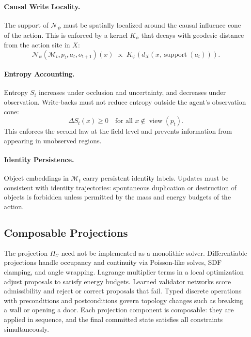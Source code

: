 \documentclass[11pt]{article}
\begin{document}
\paragraph{Causal Write Locality.}
The support of $\mathcal{N}_\psi$ must be spatially localized around the
causal influence cone of the action.
This is enforced by a kernel $K_\psi$ that decays with geodesic distance
from the action site in $X$:
\[
\mathcal{N}_\psi(\mathcal{M}_t, p_t, a_t, o_{t+1})(x)
\;\propto\;
K_\psi\!\left(d_X(x, \operatorname{support}(a_t))\right).
\]

\paragraph{Entropy Accounting.}
Entropy $S_t$ increases under occlusion and uncertainty, and decreases
under observation.
Write-backs must not reduce entropy outside the agent's observation cone:
\[
\Delta S_t(x) \ge 0 \quad \text{for all } x \notin \operatorname{view}(p_t).
\]
This enforces the second law at the field level and prevents information
from appearing in unobserved regions.

\paragraph{Identity Persistence.}
Object embeddings in $\mathcal{M}_t$ carry persistent identity labels.
Updates must be consistent with identity trajectories: spontaneous
duplication or destruction of objects is forbidden unless permitted by
the mass and energy budgets of the action.

\subsection{Composable Projections}

The projection $\Pi_{\mathcal{C}}$ need not be implemented as a monolithic
solver.
Differentiable projections handle occupancy and continuity via Poisson-like
solves, SDF clamping, and angle wrapping.
Lagrange multiplier terms in a local optimization adjust proposals to
satisfy energy budgets.
Learned validator networks score admissibility and reject or correct
proposals that fail.
Typed discrete operations with preconditions and postconditions govern
topology changes such as breaking a wall or opening a door.
Each projection component is composable: they are applied in sequence, and
the final committed state satisfies all constraints simultaneously.

\end{document}
